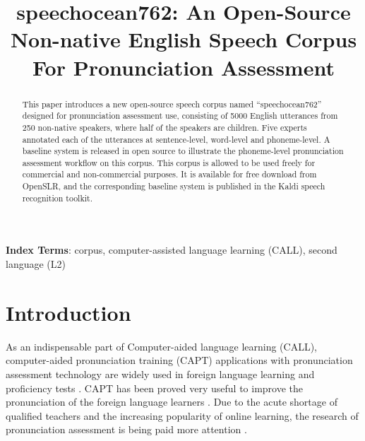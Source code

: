 \documentclass[a4paper]{article}
\title{speechocean762: An Open-Source Non-native English Speech Corpus For Pronunciation Assessment}
\begin{document}
\maketitle
% 
\begin{abstract}
  This paper introduces a new open-source speech corpus named “speechocean762” designed for pronunciation assessment use, consisting of 5000 English utterances from 250 non-native speakers, where half of the speakers are children. Five experts annotated each of the utterances at sentence-level, word-level and phoneme-level. A baseline system is released in open source to illustrate the phoneme-level pronunciation assessment workflow on this corpus. This corpus is allowed to be used freely for commercial and non-commercial purposes. It is available for free download from OpenSLR, and the corresponding baseline system is published in the Kaldi speech recognition toolkit.
\end{abstract}
\noindent\textbf{Index Terms}: corpus, computer-assisted language learning (CALL), second language (L2)

\section{Introduction}

As an indispensable part of Computer-aided language learning (CALL), computer-aided pronunciation training (CAPT) applications with pronunciation assessment technology are widely used in foreign language learning \cite{franco2010eduspeak,li2020training} and proficiency tests \cite{gu2020using}.
CAPT has been proved very useful to improve the pronunciation of the foreign language learners \cite{wang2014optimization}.
Due to the acute shortage of qualified teachers \cite{mcvey2019nuance} and the increasing popularity of online learning, the research of pronunciation assessment is being paid more attention \cite{cheng2020improving}.
\end{document}
